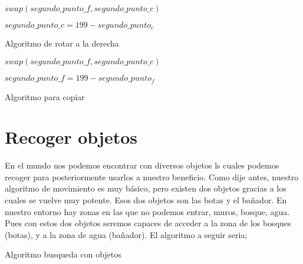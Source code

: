 \documentclass[10pt,a4paper,spanish]{article}
\begin{document}
\begin{algorithm}[H]
\SetAlgoLined

$swap(segundo\_punto\_f, segundo\_punto\_c)$\;


$segundo\_punto\_c = 199 - segundo\_punto_c$\;

\caption{Algoritmo de rotar a la derecha}
\end{algorithm}


\bigskip
\bigskip

\begin{algorithm}[H]
\SetAlgoLined

$swap(segundo\_punto\_f, segundo\_punto\_c)$\;


$segundo\_punto\_f = 199 - segundo\_punto_f$\;

\caption{Algoritmo para copiar}
\end{algorithm}



\section{Recoger objetos}

En el mundo nos podemos encontrar con diversos objetos ls cuales podemos recoger para posteriormente usarlos a nuestro beneficio. Como dije antes, nuestro algoritmo de movimiento es muy básico, pero existen dos objetos gracias a los cuales se vuelve muy potente. Esos dos objetos son las botas y el bañador. En nuestro entorno hay zonas en las que no podemos entrar, muros, bosque, agua. Pues con estos dos objetos seremos capaces de acceder a la zona de los bosques (botas), y a la zona de agua (bañador). El algoritmo a seguir seria;



\begin{algorithm}[H]
\SetAlgoLined

\caption{Algoritmo busqueda con objetos}
\end{algorithm}
\end{document}
